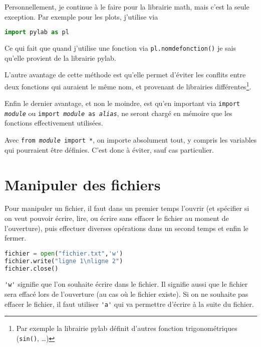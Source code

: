 \documentclass[a4paper,twoside]{article}
\begin{document}
Personnellement, je continue à le faire pour la librairie math, mais c'est la seule exception. Par exemple pour les plots, j'utilise  via
\begin{lstlisting}[language=python]
import pylab as pl
\end{lstlisting}
Ce qui fait que quand j'utilise une fonction via \texttt{pl.nomdefonction()} je sais qu'elle provient de la librairie pylab.

L'autre avantage de cette méthode est qu'elle permet d'éviter les conflits entre deux fonctions qui auraient le même nom, et provenant de librairies différentes\footnote{Par exemple la librairie pylab définit d'autres fonction trigonométriques (\texttt{sin()}, \dots)}.

Enfin le dernier avantage, et non le moindre, est qu'en important via \texttt{import \emph{module}} ou \texttt{import \emph{module} as \emph{alias}}, ne seront chargé en mémoire que les fonctions effectivement utilisées.

\begin{attention}
Avec \texttt{from \emph{module} import *}, on importe absolument tout, y compris les variables qui pourraient être définies. C'est donc à éviter, sauf cas particulier.
\end{attention}





\section{Manipuler des fichiers}

Pour manipuler un fichier, il faut dans un premier temps l'ouvrir (et spécifier si on veut pouvoir écrire, lire, ou écrire sans effacer le fichier au moment de l'ouverture), puis effectuer diverses opérations dans un second temps et enfin le fermer.

\begin{lstlisting}[language=python]
fichier = open("fichier.txt",'w')
fichier.write("ligne 1\nligne 2")
fichier.close()
\end{lstlisting}
\verb|'w'| signifie que l'on souhaite écrire dans le fichier. Il signifie aussi que le fichier sera effacé lors de l'ouverture (au cas où le fichier existe). Si on ne souhaite pas effacer le fichier, il faut utiliser \verb|'a'| qui va permettre d'écrire à la suite du fichier.
\end{document}
